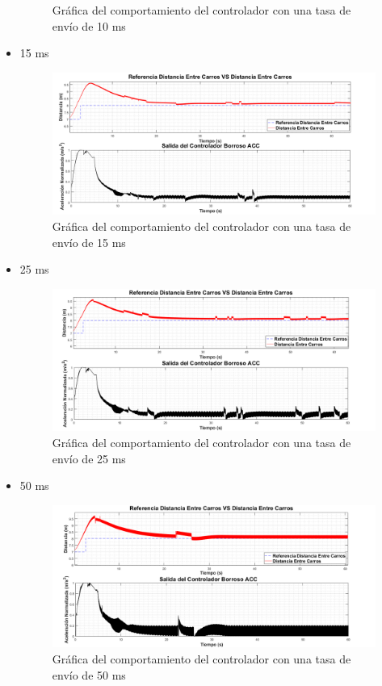 \begin{itemize}
\begin{figure}[H]
		\caption{Gráfica del comportamiento del controlador con una tasa de envío de 10 ms}
		\label{fig:sv10}
\end{figure}	
\item 15 ms
\begin{figure}[H]
	\centering
		\includegraphics[scale=0.49]{Imagenes/15sv}
		\caption{Gráfica del comportamiento del controlador con una tasa de envío de 15 ms}
		\label{fig:sv15}
\end{figure}	
\item 25 ms
\begin{figure}[H]
	\centering
		\includegraphics[scale=0.49]{Imagenes/25sv}
		\caption{Gráfica del comportamiento del controlador con una tasa de envío de 25 ms}
		\label{fig:sv25}
\end{figure}	
\item 50 ms
\begin{figure}[H]
	\centering
		\includegraphics[scale=0.49]{Imagenes/50cv}
		\caption{Gráfica del comportamiento del controlador con una tasa de envío de 50 ms}
		\label{fig:sv50}
\end{figure}	


\end{itemize}

